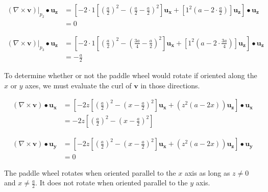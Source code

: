 \documentclass{article}
\begin{document}
\begin{equation*}
	\begin{split}
		\left(\nabla \times \mathbf{v}\right) \rvert_{p_2} \bullet \mathbf{u_z} & = \left[
		-2 \cdot 1 \left[
		{\left(\frac{a}{2}\right)}^2
		- {\left(\frac{a}{2} - \frac{a}{2}\right)}^2
		\right] \mathbf{u_x}
		+ \left[
			1^2 \left(a - 2 \cdot \frac{a}{2}\right)
			\right] \mathbf{u_z}
		\right] \bullet \mathbf{u_z} \\
		& = 0
	\end{split}
\end{equation*}

\begin{equation*}
	\begin{split}
		\left(\nabla \times \mathbf{v}\right) \rvert_{p_3} \bullet \mathbf{u_z} & = \left[
		-2 \cdot 1 \left[
		{\left(\frac{a}{2}\right)}^2
		- {\left(\frac{3a}{4} - \frac{a}{2}\right)}^2
		\right] \mathbf{u_x}
		+ \left[
			1^2 \left(a - 2 \cdot \frac{3a}{4}\right)
			\right] \mathbf{u_z}
		\right] \bullet \mathbf{u_z} \\
		& = -\frac{a}{2}
	\end{split}
\end{equation*}

\newpage

To determine whether or not the paddle wheel would rotate if oriented along the $x$ or $y$ axes, we must evaluate the
curl of $\mathbf{v}$ in those directions.

\begin{equation*}
	\begin{split}
		\left(\nabla \times \mathbf{v}\right) \bullet \mathbf{u_x} & = \left[
		-2z \left[
		{\left(\frac{a}{2}\right)}^2
		- {\left(x - \frac{a}{2}\right)}^2
		\right]\mathbf{u_x}
		+ \left(z^2 (a - 2x)\right)\mathbf{u_z}
		\right] \bullet \mathbf{u_x} \\
		& = -2z \left[{\left(\frac{a}{2}\right)}^2 - {\left(x - \frac{a}{2}\right)}^2\right]
	\end{split}
\end{equation*}

\begin{equation*}
	\begin{split}
		\left(\nabla \times \mathbf{v}\right) \bullet \mathbf{u_y} & = \left[
		-2z \left[
		{\left(\frac{a}{2}\right)}^2
		- {\left(x - \frac{a}{2}\right)}^2
		\right]\mathbf{u_x}
		+ \left(z^2 (a - 2x)\right)\mathbf{u_z}
		\right] \bullet \mathbf{u_y} \\
		& = 0
	\end{split}
\end{equation*}

The paddle wheel rotates when oriented parallel to the $x$ axis as long as $z \neq 0$ and $x \neq \frac{a}{2}$. It does
not rotate when oriented parallel to the $y$ axis.
\end{document}
